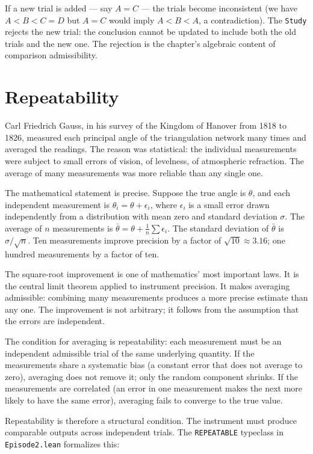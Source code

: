 If a new trial is added --- say $A = C$ --- the trials become
inconsistent (we have $A < B < C = D$ but $A = C$ would imply
$A < B < A$, a contradiction). The \texttt{Study} rejects the new
trial: the conclusion cannot be updated to include both the old
trials and the new one. The rejection is the chapter's algebraic
content of comparison admissibility.

\section{Repeatability}
\label{se:repeatability}

Carl Friedrich Gauss, in his survey of the Kingdom of Hanover from 1818
to 1826, measured each principal angle of the triangulation network many
times and averaged the readings. The reason was statistical: the
individual measurements were subject to small errors of vision, of
levelness, of atmospheric refraction. The average of many measurements
was more reliable than any single one.

The mathematical statement is precise. Suppose the true angle is
$\theta$, and each independent measurement is $\theta_i = \theta +
\epsilon_i$, where $\epsilon_i$ is a small error drawn independently
from a distribution with mean zero and standard deviation $\sigma$. The
average of $n$ measurements is $\bar{\theta} = \theta + \frac{1}{n}
\sum \epsilon_i$. The standard deviation of $\bar{\theta}$ is
$\sigma / \sqrt{n}$. Ten measurements improve precision by a factor of
$\sqrt{10} \approx 3.16$; one hundred measurements by a factor of ten.

The square-root improvement is one of mathematics' most important laws.
It is the central limit theorem applied to instrument precision. It
makes averaging admissible: combining many measurements produces a
more precise estimate than any one. The improvement is not arbitrary;
it follows from the assumption that the errors are independent.

The condition for averaging is repeatability: each measurement must be
an independent admissible trial of the same underlying quantity. If
the measurements share a systematic bias (a constant error that does
not average to zero), averaging does not remove it; only the random
component shrinks. If the measurements are correlated (an error in one
measurement makes the next more likely to have the same error),
averaging fails to converge to the true value.

Repeatability is therefore a structural condition. The instrument must
produce comparable outputs across independent trials. The
\texttt{REPEATABLE} typeclass in \texttt{Episode2.lean} formalizes
this:

